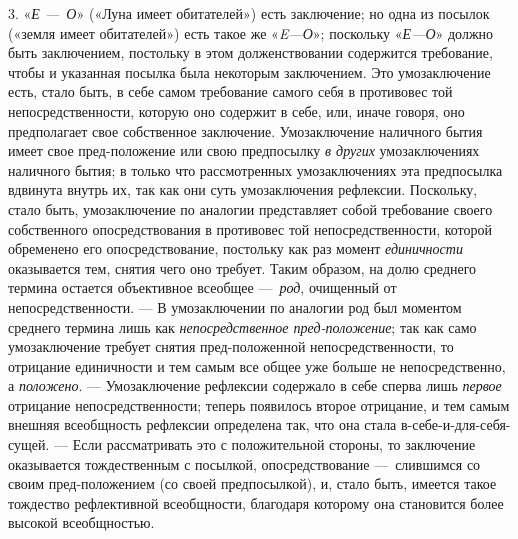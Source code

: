 \documentclass[twoside]{article}
\begin{document}
{{{{{{3. «{\em Е —~О}»
(«Луна имеет обитателей») есть заключение; но одна из посылок
(«земля имеет обитателей») есть такое же «{\em E---О}»;
поскольку «{\em Е---О}»
должно быть заключением, постольку в этом долженствовании
содержится требование, чтобы и указанная посылка была некоторым
заключением. Это умозаключение есть, стало быть, в себе самом требование
самого себя в противовес той непосредственности, которую оно содержит в
себе, или, иначе говоря, оно предполагает свое собственное заключение.
Умозаключение наличного бытия имеет свое пред-положение или свою
предпосылку {\em в других}
умозаключениях наличного бытия; в только что
рассмотренных умозаключениях эта предпосылка вдвинута внутрь
их, так как они суть умозаключения рефлексии. Поскольку, стало быть,
умозаключение по аналогии представляет собой требование своего собственного
опосредствования в противовес той непосредственности, которой обременено
его опосредствование, постольку как раз момент
{\em единичности}
оказывается тем, снятия чего оно требует. Таким образом, на
долю среднего термина остается объективное всеобщее
—~{\em род}, очищенный от
непосредственности. — В умозаключении по аналогии род был
моментом среднего термина лишь как
{\em непосредственное пред-положение};
так как само умозаключение требует снятия пред-положенной
непосредственности, то отрицание единичности и тем самым все общее уже
больше не непосредственно, а
{\em положено}. —
Умозаключение рефлексии содержало в себе сперва лишь
{\em первое} отрицание
непосредственности; теперь появилось второе отрицание, и тем самым внешняя
всеобщность рефлексии определена так, что она стала
в-себе-и-для-себя-сущей. — Если рассматривать это с
положительной стороны, то заключение оказывается тождественным с посылкой,
опосредствование —~слившимся со своим пред-положением (со
своей предпосылкой), и, стало быть, имеется такое тождество рефлективной
всеобщности, благодаря которому она становится более высокой
всеобщностью.

}}}}}}
\end{document}
